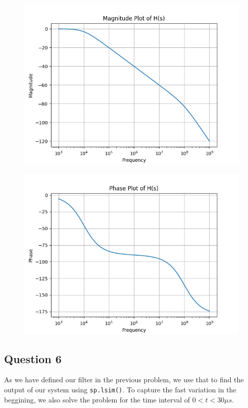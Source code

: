 \documentclass[11pt, a4paper]{article}
\begin{document}
\begin{figure}[H]
     \centering
     \includegraphics[scale=0.8]{Figure_9.png}
\end{figure}

\begin{figure}[H]
     \centering
     \includegraphics[scale=0.8]{Figure_10.png}
\end{figure}


\subsection{Question 6}

As we have defined our filter in the previous problem, we use that to find the output of our system using \texttt{sp.lsim()}. To capture the fast variation in the beggining, we also solve the problem for the time interval of $0 <t < 30 \mu s$.
\end{document}
